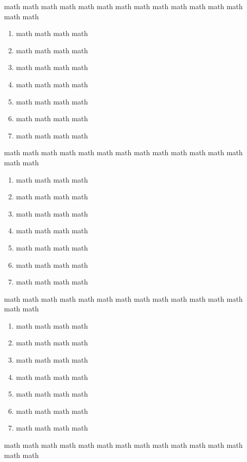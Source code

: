 \documentclass[12pt,a4paper]{article}
\begin{document}
\begin{multicols}{2}
\begin{Exercice}math math math math math math math math math math math math math math math
\begin{enumerate}[label=\textbf{\color{gris}\arabic*.}]
    \item math math math math
    \item math math math math
    \item math math math math
    \item math math math math
    \item math math math math
    \item math math math math
    \item math math math math
\end{enumerate}
\end{Exercice}
\begin{Exercice}math math math math math math math math math math math math math math math
\begin{enumerate}[label=\textbf{\color{gris}\arabic*.}]
    \item math math math math
    \item math math math math
    \item math math math math
    \item math math math math
    \item math math math math
    \item math math math math
    \item math math math math
\end{enumerate}
\end{Exercice}
\begin{Exercice}math math math math math math math math math math math math math math math
\begin{enumerate}[label=\textbf{\color{gris}\arabic*.}]
    \item math math math math
    \item math math math math
    \item math math math math
    \item math math math math
    \item math math math math
    \item math math math math
    \item math math math math
\end{enumerate}
\end{Exercice}
\begin{Exercice}math math math math math math math math math math math math math math math

\end{Exercice}
\end{multicols}
\end{document}
